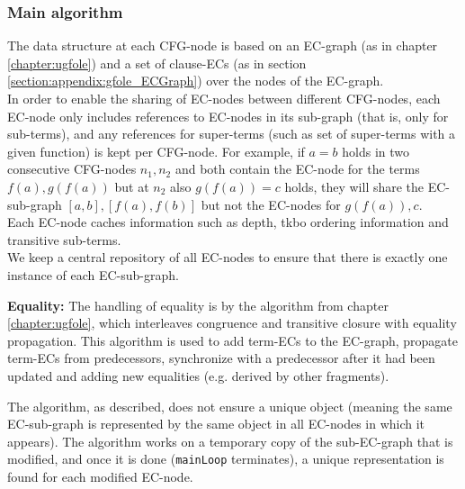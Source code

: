 \subsubsection*{Main algorithm}
The data structure at each CFG-node is based on an EC-graph (as in chapter \ref{chapter:ugfole}) and a set of clause-ECs (as in section \ref{section:appendix:gfole_ECGraph}) over the nodes of the EC-graph.\\
In order to enable the sharing of EC-nodes between different CFG-nodes, each EC-node only includes references to EC-nodes in its sub-graph (that is, only for sub-terms), and any references for super-terms (such as set of super-terms with a given function) is kept per CFG-node.
For example, if $a=b$ holds in two consecutive CFG-nodes $n_1,n_2$ and both contain the EC-node for the terms $f(a),g(f(a))$ but at $n_2$ also $g(f(a))=c$ holds, they will share the EC-sub-graph $[a,b],[f(a),f(b)]$ but not the EC-nodes for $g(f(a)),c$.\\
Each EC-node caches information such as depth, tkbo ordering information and transitive sub-terms.\\
We keep a central repository of all EC-nodes to ensure that there is exactly one instance of each EC-sub-graph.

\textbf{Equality:}
The handling of equality is by the algorithm from chapter \ref{chapter:ugfole}, which interleaves congruence and transitive closure with equality propagation. This algorithm is used to add term-ECs to the EC-graph, propagate term-ECs from predecessors, synchronize with a predecessor after it had been updated and adding new equalities (e.g. derived by other fragments).

The algorithm, as described, does not ensure a unique object (meaning the same EC-sub-graph is represented by the same object in all EC-nodes in which it appears). The algorithm works on a temporary copy of the sub-EC-graph that is modified, and once it is done (\lstinline|mainLoop| terminates), a unique representation is found for each modified EC-node.

